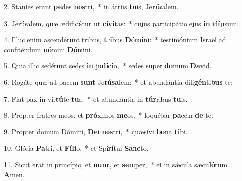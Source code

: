 2. Stantes erant \textbf{pe}des \textbf{nos}tri,~*  in átriis \textbf{tu}is, Je\textbf{rú}salem.\

3. Jerúsalem, quæ ædifi\textbf{cá}tur ut \textbf{cí}\textbf{vi}tas:~*  cujus participátio ejus \textbf{in} id\textbf{íp}sum.\

4. Illuc enim ascendérunt tribus, \textbf{tri}bus \textbf{Dó}\textbf{mi}ni:~*  testimónium Israël ad confiténdum \textbf{nó}mini \textbf{Dó}mini.\

5. Quia illic sedérunt sedes \textbf{in} ju\textbf{dí}\textbf{ci}o,~*  sedes super \textbf{do}mum \textbf{Da}vid.\

6. Rogáte quæ ad pacem \textbf{sunt} Je\textbf{rú}\textbf{sa}lem:~*  et abundántia dili\textbf{gén}ti\textbf{bus} te:\

7. Fiat pax in vir\textbf{tú}te \textbf{tu}a:~*  et abundántia in \textbf{túr}ribus \textbf{tu}is.\

8. Propter fratres meos, et \textbf{pró}ximos \textbf{me}os,~*  loquébar \textbf{pa}cem \textbf{de} te:\

9. Propter domum Dómini, \textbf{De}i \textbf{nos}tri,~*  quæsívi \textbf{bo}na \textbf{ti}bi.\

10. Glória \textbf{Pa}tri, et \textbf{Fí}\textbf{li}o,~*  et Spi\textbf{rí}tui \textbf{Sanc}to.\

11. Sicut erat in princípio, et \textbf{nunc}, et \textbf{sem}per,~*  et in sǽcula sæcu\textbf{ló}rum. \textbf{A}men.\

